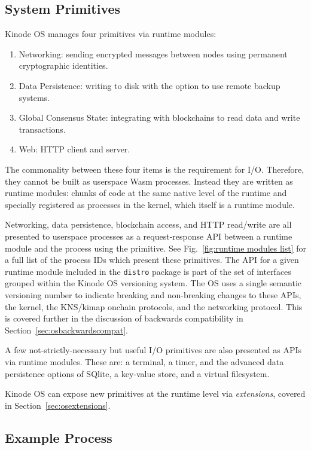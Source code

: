 \documentclass[runningheads]{llncs}
\begin{document}
\subsection{System Primitives}
\label{sec:osprimitives}

Kinode OS manages four primitives via runtime modules:

\begin{enumerate}
    \item Networking: sending encrypted messages between nodes using permanent cryptographic identities.
    \item Data Persistence: writing to disk with the option to use remote backup systems.
    \item Global Consensus State: integrating with blockchains to read data and write transactions.
    \item Web: HTTP client and server.
\end{enumerate}

The commonality between these four items is the requirement for I/O.
Therefore, they cannot be built as userspace Wasm processes.
Instead they are written as runtime modules: chunks of code at the same native level of the runtime and specially registered as processes in the kernel, which itself is a runtime module.

Networking, data persistence, blockchain access, and HTTP read/write are all presented to userspace processes as a request-response API between a runtime module and the process using the primitive.
See Fig.~\ref{fig:runtime modules list} for a full list of the process IDs which present these primitives.
The API for a given runtime module included in the \verb|distro| package is part of the set of interfaces grouped within the Kinode OS versioning system.
The OS uses a single semantic versioning number to indicate breaking and non-breaking changes to these APIs, the kernel, the KNS/kimap onchain protocols, and the networking protocol.
This is covered further in the discussion of backwards compatibility in Section~\ref{sec:osbackwardscompat}.

A few not-strictly-necessary but useful I/O primitives are also presented as APIs via runtime modules.
These are: a terminal, a timer, and the advanced data persistence options of SQlite, a key-value store, and a virtual filesystem.

Kinode OS can expose new primitives at the runtime level via \textit{extensions}, covered in Section~\ref{sec:osextensions}.

\subsection{Example Process}
\label{sec:osexampleprocess}
\end{document}
